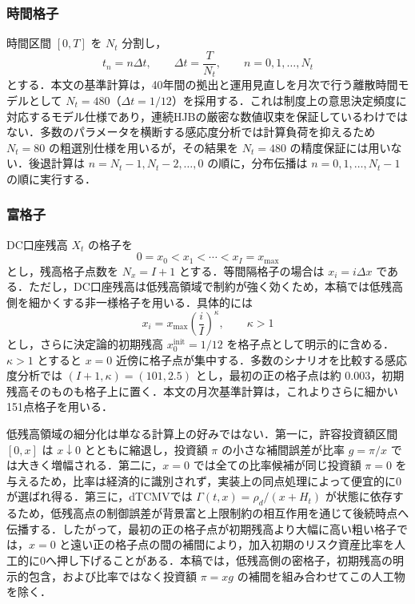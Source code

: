 \documentclass[10pt,a4paper]{article}
\theoremstyle{plain}
\theoremstyle{definition}
\begin{document}
\subsubsection{時間格子}

時間区間 $[0,T]$ を $N_t$ 分割し，
\begin{equation}
  t_n=n\Delta t,
  \qquad
  \Delta t=\frac{T}{N_t},
  \qquad n=0,1,\ldots,N_t
  \label{eq:time-grid}
\end{equation}
とする．本文の基準計算は，40年間の拠出と運用見直しを月次で行う離散時間モデルとして $N_t=480$（$\Delta t=1/12$）を採用する．これは制度上の意思決定頻度に対応するモデル仕様であり，連続HJBの厳密な数値収束を保証しているわけではない．多数のパラメータを横断する感応度分析では計算負荷を抑えるため $N_t=80$ の粗選別仕様を用いるが，その結果を $N_t=480$ の精度保証には用いない．後退計算は $n=N_t-1,N_t-2,\ldots,0$ の順に，分布伝播は $n=0,1,\ldots,N_t-1$ の順に実行する．

\subsubsection{富格子}

DC口座残高 $X_t$ の格子を
\begin{equation}
  0=x_0<x_1<\cdots<x_I=x_{\max}
  \label{eq:wealth-grid}
\end{equation}
とし，残高格子点数を $N_x=I+1$ とする．等間隔格子の場合は $x_i=i\Delta x$ である．ただし，DC口座残高は低残高領域で制約が強く効くため，本稿では低残高側を細かくする非一様格子を用いる．具体的には
\begin{equation}
  x_i=x_{\max}\left(\frac{i}{I}\right)^\kappa,
  \qquad \kappa>1
  \label{eq:nonuniform-grid}
\end{equation}
とし，さらに決定論的初期残高 $x_0^{\mathrm{init}}=1/12$ を格子点として明示的に含める．$\kappa>1$ とすると $x=0$ 近傍に格子点が集中する．多数のシナリオを比較する感応度分析では $(I+1,\kappa)=(101,2.5)$ とし，最初の正の格子点は約 $0.003$，初期残高そのものも格子上に置く．本文の月次基準計算は，これよりさらに細かい151点格子を用いる．

低残高領域の細分化は単なる計算上の好みではない．第一に，許容投資額区間 $[0,x]$ は $x\downarrow0$ とともに縮退し，投資額 $\pi$ の小さな補間誤差が比率 $g=\pi/x$ では大きく増幅される．第二に，$x=0$ では全ての比率候補が同じ投資額 $\pi=0$ を与えるため，比率は経済的に識別されず，実装上の同点処理によって便宜的に0が選ばれ得る．第三に，dTCMVでは $\Gamma(t,x)=\rho_d/(x+H_t)$ が状態に依存するため，低残高点の制御誤差が背景富と上限制約の相互作用を通じて後続時点へ伝播する．したがって，最初の正の格子点が初期残高より大幅に高い粗い格子では，$x=0$ と遠い正の格子点の間の補間により，加入初期のリスク資産比率を人工的に0へ押し下げることがある．本稿では，低残高側の密格子，初期残高の明示的包含，および比率ではなく投資額 $\pi=xg$ の補間を組み合わせてこの人工物を除く．
\end{document}
